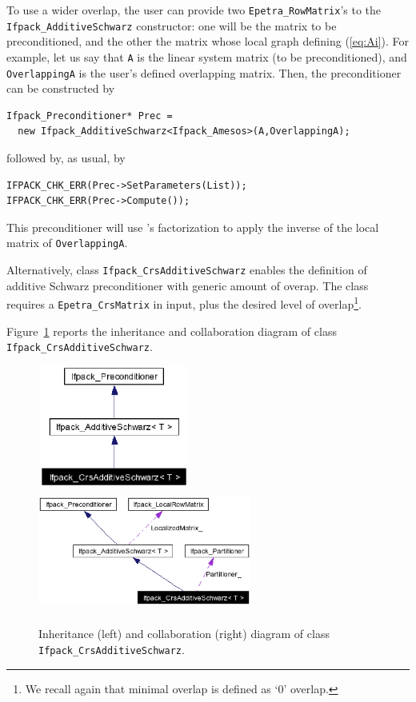 To use a wider overlap, the user can provide two \verb!Epetra_RowMatrix!'s to the
\verb!Ifpack_AdditiveSchwarz! constructor: one will be the matrix to be
preconditioned, and the other the matrix whose local graph defining
(\ref{eq:Ai}).
For example, let us say that \verb!A! is the linear system matrix (to be
preconditioned), and \verb!OverlappingA! is the user's defined overlapping
matrix. Then, the preconditioner can be constructed by
\begin{verbatim}
Ifpack_Preconditioner* Prec = 
  new Ifpack_AdditiveSchwarz<Ifpack_Amesos>(A,OverlappingA);
\end{verbatim}
\hspace*{1cm}
followed by, as usual, by
\begin{verbatim}
IFPACK_CHK_ERR(Prec->SetParameters(List));
IFPACK_CHK_ERR(Prec->Compute());
\end{verbatim}

This preconditioner will use \amesos's factorization to apply the inverse of
the local matrix of \verb!OverlappingA!.

\smallskip

Alternatively, class \verb!Ifpack_CrsAdditiveSchwarz! 
enables the definition of additive
Schwarz preconditioner with generic amount of overap. The class requires a
\verb!Epetra_CrsMatrix! in input, plus the desired level of
overlap\footnote{We recall again that minimal overlap is defined as `0' overlap.}. 

Figure~\ref{fig:uml_additive} reports the inheritance and collaboration
diagram of class \verb!Ifpack_CrsAdditiveSchwarz!.

\begin{figure}
\begin{center}
\includegraphics[width=5cm,height=4cm]{CrsAdditiveSchwarz_Inheritance.eps}
\hspace*{1cm}
\includegraphics[width=7cm,height=4cm]{CrsAdditiveSchwarz_Collaboration.eps}
\caption{Inheritance (left) and collaboration (right) diagram of class
  {\tt Ifpack\_CrsAdditiveSchwarz}.}
  \label{fig:uml_additive}
\end{center}
\end{figure}


